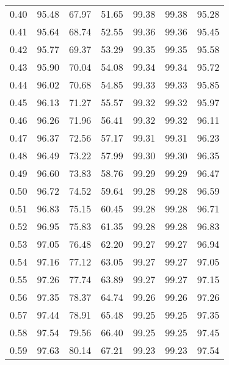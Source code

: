 \begin{tabular}{|c|c|c|c|c|c|c|}
      0.40 &     95.48 &     67.97 &      51.65 &   99.38 &      99.38 &         95.28 \\
      0.41 &     95.64 &     68.74 &      52.55 &   99.36 &      99.36 &         95.45 \\
      0.42 &     95.77 &     69.37 &      53.29 &   99.35 &      99.35 &         95.58 \\
      0.43 &     95.90 &     70.04 &      54.08 &   99.34 &      99.34 &         95.72 \\
      0.44 &     96.02 &     70.68 &      54.85 &   99.33 &      99.33 &         95.85 \\
      0.45 &     96.13 &     71.27 &      55.57 &   99.32 &      99.32 &         95.97 \\
      0.46 &     96.26 &     71.96 &      56.41 &   99.32 &      99.32 &         96.11 \\
      0.47 &     96.37 &     72.56 &      57.17 &   99.31 &      99.31 &         96.23 \\
      0.48 &     96.49 &     73.22 &      57.99 &   99.30 &      99.30 &         96.35 \\
      0.49 &     96.60 &     73.83 &      58.76 &   99.29 &      99.29 &         96.47 \\
      0.50 &     96.72 &     74.52 &      59.64 &   99.28 &      99.28 &         96.59 \\
      0.51 &     96.83 &     75.15 &      60.45 &   99.28 &      99.28 &         96.71 \\
      0.52 &     96.95 &     75.83 &      61.35 &   99.28 &      99.28 &         96.83 \\
      0.53 &     97.05 &     76.48 &      62.20 &   99.27 &      99.27 &         96.94 \\
      0.54 &     97.16 &     77.12 &      63.05 &   99.27 &      99.27 &         97.05 \\
      0.55 &     97.26 &     77.74 &      63.89 &   99.27 &      99.27 &         97.15 \\
      0.56 &     97.35 &     78.37 &      64.74 &   99.26 &      99.26 &         97.26 \\
      0.57 &     97.44 &     78.91 &      65.48 &   99.25 &      99.25 &         97.35 \\
      0.58 &     97.54 &     79.56 &      66.40 &   99.25 &      99.25 &         97.45 \\
      0.59 &     97.63 &     80.14 &      67.21 &   99.23 &      99.23 &         97.54 \\

\end{tabular}
